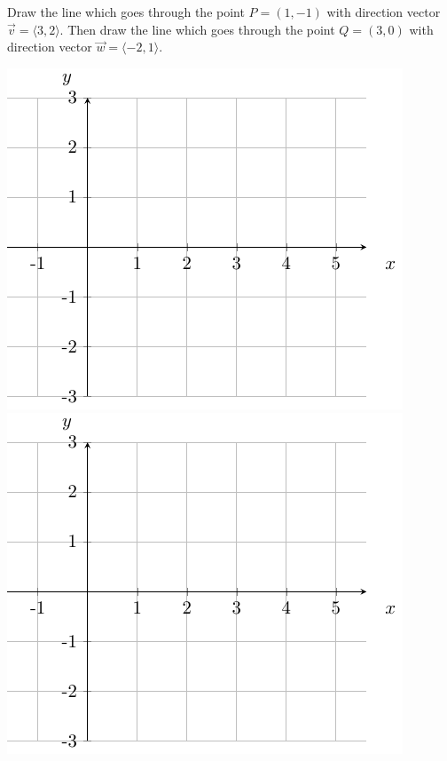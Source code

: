 \begin{ex}
    Draw the line which goes through the point $P=(1,-1)$ with direction vector $\vec{v}=\langle 3,2\rangle$. Then draw the line which goes through the point $Q=(3,0)$ with direction vector $\vec{w}=\langle -2,1\rangle$.
\end{ex}
\includegraphics[scale=.8]{tikz-pictures/section-9.2-pic1-axes-for-vectors.pdf} 
\hfill 
\includegraphics[scale=.8]{tikz-pictures/section-9.2-pic1-axes-for-vectors.pdf}

